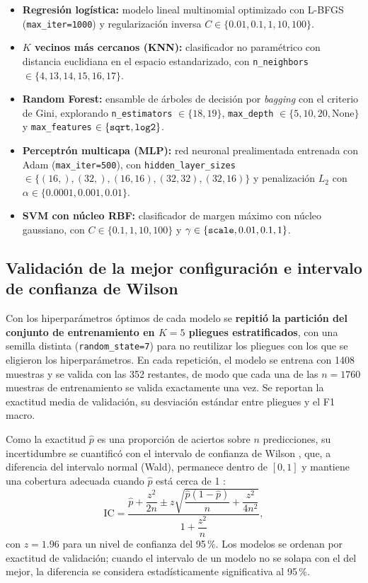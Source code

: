 \documentclass[conference]{IEEEtran}
\begin{document}
\begin{itemize}
    \item \textbf{Regresión logística:} modelo lineal multinomial optimizado con L-BFGS (\texttt{max\_iter=1000}) y regularización inversa $C \in \{0.01, 0.1, 1, 10, 100\}$.
    \item \textbf{$K$ vecinos más cercanos (KNN):} clasificador no paramétrico con distancia euclidiana en el espacio estandarizado, con \texttt{n\_neighbors} $\in \{4, 13, 14, 15, 16, 17\}$.
    \item \textbf{Random Forest:} ensamble de árboles de decisión por \emph{bagging} con el criterio de Gini, explorando \texttt{n\_estimators} $\in \{18, 19\}$, \texttt{max\_depth} $\in \{5, 10, 20, \text{None}\}$ y \texttt{max\_features} $\in \{\text{\texttt{sqrt}}, \text{\texttt{log2}}\}$.
    \item \textbf{Perceptrón multicapa (MLP):} red neuronal prealimentada entrenada con Adam (\texttt{max\_iter=500}), con \texttt{hidden\_layer\_sizes} $\in \{(16,), (32,), (16, 16), (32, 32), (32, 16)\}$ y penalización $L_2$ con $\alpha \in \{0.0001, 0.001, 0.01\}$.
    \item \textbf{SVM con núcleo RBF:} clasificador de margen máximo con núcleo gaussiano, con $C \in \{0.1, 1, 10, 100\}$ y $\gamma \in \{\text{\texttt{scale}}, 0.01, 0.1, 1\}$.
\end{itemize}

\subsection{Validación de la mejor configuración e intervalo de confianza de Wilson}

Con los hiperparámetros óptimos de cada modelo se \textbf{repitió la partición del conjunto de entrenamiento en $K=5$ pliegues estratificados}, con una semilla distinta (\texttt{random\_state=7}) para no reutilizar los pliegues con los que se eligieron los hiperparámetros. En cada repetición, el modelo se entrena con 1408 muestras y se valida con las 352 restantes, de modo que cada una de las $n=1760$ muestras de entrenamiento se valida exactamente una vez. Se reportan la exactitud media de validación, su desviación estándar entre pliegues y el F1 macro.

Como la exactitud $\hat{p}$ es una proporción de aciertos sobre $n$ predicciones, su incertidumbre se cuantificó con el intervalo de confianza de Wilson \cite{wilson1927}, que, a diferencia del intervalo normal (Wald), permanece dentro de $[0,1]$ y mantiene una cobertura adecuada cuando $\hat{p}$ está cerca de 1 \cite{agresti1998}:
\begin{equation}
\mathrm{IC} = \frac{\hat{p} + \dfrac{z^{2}}{2n} \pm z\sqrt{\dfrac{\hat{p}(1-\hat{p})}{n} + \dfrac{z^{2}}{4n^{2}}}}{1 + \dfrac{z^{2}}{n}},
\label{eq:wilson}
\end{equation}
con $z=1.96$ para un nivel de confianza del 95\,\%. Los modelos se ordenan por exactitud de validación; cuando el intervalo de un modelo no se solapa con el del mejor, la diferencia se considera estadísticamente significativa al 95\,\%.
\end{document}
